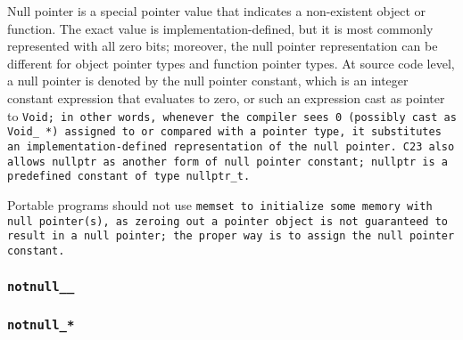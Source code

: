 Null pointer is a special pointer value that
indicates a non-existent object or function.
The exact value is implementation-defined,
but it is most commonly represented with all zero bits;
moreover, the null pointer representation can be different
for object pointer types and function pointer types.
At source code level, a null pointer is denoted by the null pointer constant,
which is an integer constant expression that evaluates to zero,
or such an expression cast as pointer to \tt{Void};
in other words, whenever the compiler sees 0 (possibly cast
as \tt{Void_ *}) assigned to or compared with a pointer type,
it substitutes an implementation-defined representation of the null pointer.
C23 also allows \tt{nullptr} as another form of null pointer constant;
\tt{nullptr} is a predefined constant of type \tt{nullptr_t}.

\note Portable programs should not use \tt{memset} to initialize some memory
with null pointer(s), as zeroing out a pointer object is not guaranteed to
result in a null pointer; the proper way is to assign the null pointer constant.

\subsubsection{\tt{notnull__}}


\subsubsection{\tt{notnull_}*}

